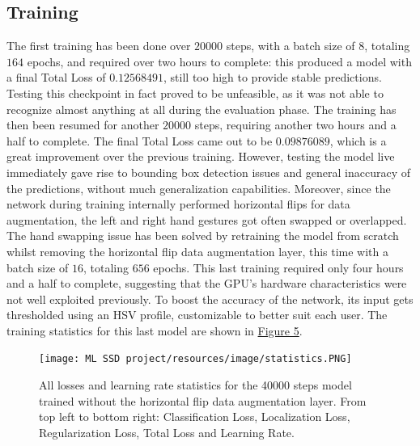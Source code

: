\documentclass[10pt,twocolumn,letterpaper]{article}
\begin{document}
\subsection{Training}
\begin{flushleft}
The first training has been done over $20000$ steps, with a batch size of $8$, totaling $164$ epochs, and required over two hours to complete: this produced a model with a final Total Loss of $0.12568491$, still too high to provide stable predictions. Testing this checkpoint in fact proved to be unfeasible, as it was not able to recognize almost anything at all during the evaluation phase.
The training has then been resumed for another $20000$ steps, requiring another two hours and a half to complete. The final Total Loss came out to be $0.09876089$, which is a great improvement over the previous training. However, testing the model live immediately gave rise to bounding box detection issues and general inaccuracy of the predictions, without much generalization capabilities. Moreover, since the network during training internally performed horizontal flips for data augmentation, the left and right hand gestures got often swapped or overlapped.
The hand swapping issue has been solved by retraining the model from scratch whilst removing the horizontal flip data augmentation layer, this time with a batch size of $16$, totaling $656$ epochs. This last training required only four hours and a half to complete, suggesting that the GPU's hardware characteristics were not well exploited previously.
To boost the accuracy of the network, its input gets thresholded using an HSV profile, customizable to better suit each user.
The training statistics for this last model are shown in \hyperref[figure5]{Figure 5}.

\begin{figure}[!h]
    \centering
    \texttt{[image: ML SSD project/resources/image/statistics.PNG]} \caption{All losses and learning rate statistics for the 40000 steps model trained without the horizontal flip data augmentation layer. From top left to bottom right: Classification Loss, Localization Loss, Regularization Loss, Total Loss and Learning Rate.}
\end{figure}
\label{figure5}

\end{flushleft}
\end{document}
